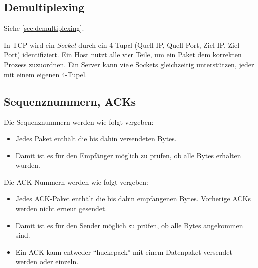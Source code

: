         \subsection{Demultiplexing}
            Siehe \ref{sec:demultiplexing}.
            
            In TCP wird ein \textit{Socket} durch ein 4-Tupel (Quell IP, Quell Port, Ziel IP, Ziel Port) identifiziert. Ein Host nutzt alle vier Teile, um ein Paket dem korrekten Prozess zuzuordnen. Ein Server kann viele Sockets gleichzeitig unterstützen, jeder mit einem eigenen 4-Tupel.

        \subsection{Sequenznummern, ACKs}
            Die Sequenznummern werden wie folgt vergeben:
            \begin{itemize}
            	\item Jedes Paket enthält die bis dahin versendeten Bytes.
            	\item Damit ist es für den Empfänger möglich zu prüfen, ob alle Bytes erhalten wurden.
            \end{itemize}
            Die ACK-Nummern werden wie folgt vergeben:
            \begin{itemize}
            	\item Jedes ACK-Paket enthält die bis dahin empfangenen Bytes. Vorherige ACKs werden nicht erneut gesendet.
            	\item Damit ist es für den Sender möglich zu prüfen, ob alle Bytes angekommen sind.
            	\item Ein ACK kann entweder \enquote{huckepack} mit einem Datenpaket versendet werden oder einzeln.
            \end{itemize}
            

